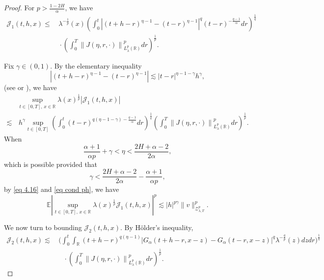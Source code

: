 \documentclass[11pt,reqno]{amsart}
\numberwithin{equation}{section}
\newcommand{\1}{{\bf 1}}
\newcommand{\2}{{\bf 2}}
\begin{document}
\begin{proof}
  For $p>\frac{1-2H}{\alpha}$, we have
    \begin{equation}\label{eq 4.28}
    \begin{split}
\mathcal{J}_1(t,h,x)\le &\,  \lambda^{-\frac1p}(x)\left(\int_0^t\left|(t+h-r)^{\eta-1}-(t-r)^{\eta-1}\right|^q(t-r)^{-\frac{q-1}{\alpha}}{dr}\right)^{\frac1q}\\
&\, \cdot
\left(\int_0^T\left\|J(\eta,r,\cdot)\right\|^p_{L_\lambda^p(\mathbb{R})}dr\right)^{\frac1p}.
\end{split}
\end{equation}

Fix $\gamma\in(0,1)$. By the elementary inequality $$\left|(t+h-r)^{\eta-1}-(t-r)^{\eta-1}\right|\lesssim |t-r|^{\eta-1-\gamma}h^{\gamma},$$
(see \cite[Page 264]{SS2002} or \cite[(4.29)]{HW2022}),   we have
\begin{equation}\label{eq cond ph}
\begin{split}
& \sup_{{t\in[0,T],\,x\in\mathbb R}}\lambda(x)^{\frac1p}\left|\mathcal{J}_1(t,h,x)\right|\\
\lesssim &\, h^{\gamma}\sup_{t\in[0,T]}\left( \int_0^t(t-r)^{q(\eta-1-\gamma)-\frac{q-1}{\alpha}}dr\right)^{\frac1q}\left(\int_0^T\left\|J(\eta,r,\cdot)\right\|^p_{L_\lambda^p(\mathbb{R})}dr\right)^{\frac1p}.
\end{split}
\end{equation}
When  $$\frac{\alpha+1}{\alpha p}+\gamma<\eta<\frac{2H+\alpha-2}{2\alpha},$$ 
which is possible provided that 
$$\gamma<\frac{2H+\alpha-2}{2\alpha}-\frac{\alpha+1}{\alpha p},$$
 by   \eqref{eq 4.16} and \eqref{eq cond ph},  we have
\begin{equation}\label{eq 4.30}
\mathbb{E}\left|\sup_{{t\in[0,T],\,x\in\mathbb R}} \lambda(x)^{\frac1p}\mathcal{J}_1(t,h,x)\right|^p\lesssim |h|^{p\gamma}\|v\|_{\mathcal{Z}_{\lambda,T}^p}^p.
\end{equation}

We now turn to bounding $\mathcal{J}_2(t, h, x)$. By  H\"older's  inequality,
\begin{align*}
\mathcal{J}_2(t, h, x)  \lesssim &\, \Bigg(\int_0^t\int_{\mathbb{R}} (t+h-r)^{q(\eta-1)}\big|G_{\alpha}(t+h-r,x-z)-G_{\alpha}(t-r,x-z)\big|^q \lambda^{-\frac{q}{p}}(z)dzdr\Bigg)^{\frac1q} \\
&\ \ \  \ \cdot \left(\int_0^T\left\|J(\eta,r,\cdot)\right\|^p_{L_\lambda^p(\mathbb{R})}dr\right)^{\frac1p}.
\end{align*}


\end{proof}
\end{document}
